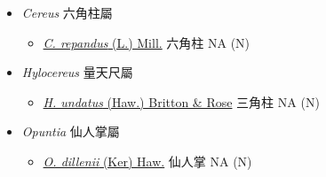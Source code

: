 
  \begin{itemize}
 \item[] \textit{Cereus} 六角柱屬
                                
  \begin{itemize}
        \item[] \href{http://www.theplantlist.org/tpl1.1/search?q=Cereus+repandus}{\textit{C. repandus} (L.) Mill.}   六角柱   NA (N)
  \end{itemize}
 \item[] \textit{Hylocereus} 量天尺屬
                                
  \begin{itemize}
        \item[] \href{http://www.theplantlist.org/tpl1.1/search?q=Hylocereus+undatus}{\textit{H. undatus} (Haw.) Britton \& Rose}   三角柱   NA (N)
  \end{itemize}
 \item[] \textit{Opuntia} 仙人掌屬
                                
  \begin{itemize}
        \item[] \href{http://www.theplantlist.org/tpl1.1/search?q=Opuntia+dillenii}{\textit{O. dillenii} (Ker) Haw.}   仙人掌   NA (N)
  \end{itemize}
  \end{itemize}
